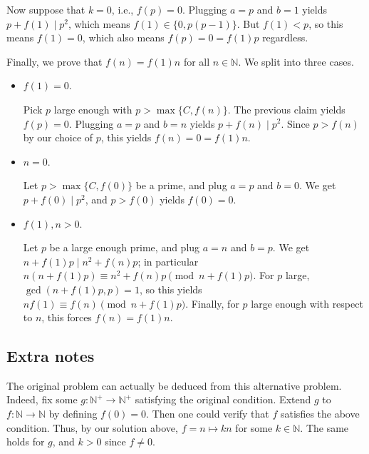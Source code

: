 \documentclass{article}
\newcommand{\N}{\mathbb{N}}
\begin{document}
Now suppose that $k = 0$, i.e., $f(p) = 0$.
Plugging $a = p$ and $b = 1$ yields $p + f(1) \mid p^2$, which means $f(1) \in \{0, p(p - 1)\}$.
But $f(1) < p$, so this means $f(1) = 0$, which also means $f(p) = 0 = f(1) p$ regardless.

Finally, we prove that $f(n) = f(1) n$ for all $n \in \N$.
We split into three cases.

\begin{itemize}

    \item
    $f(1) = 0$.

    Pick $p$ large enough with $p > \max\{C, f(n)\}$.
    The previous claim yields $f(p) = 0$.
    Plugging $a = p$ and $b = n$ yields $p + f(n) \mid p^2$.
    Since $p > f(n)$ by our choice of $p$, this yields $f(n) = 0 = f(1) n$.

    \item 
    $n = 0$.
    
    Let $p > \max\{C, f(0)\}$ be a prime, and plug $a = p$ and $b = 0$.
    We get $p + f(0) \mid p^2$, and $p > f(0)$ yields $f(0) = 0$.

    \item
    $f(1), n > 0$.

    Let $p$ be a large enough prime, and plug $a = n$ and $b = p$.
    We get $n + f(1) p \mid n^2 + f(n) p$; in particular $n (n + f(1) p) \equiv n^2 + f(n) p \pmod{n + f(1) p}$.
    For $p$ large, $\gcd(n + f(1) p, p) = 1$, so this yields $n f(1) \equiv f(n) \pmod{n + f(1) p}$.
    Finally, for $p$ large enough with respect to $n$, this forces $f(n) = f(1) n$.

\end{itemize}



\subsection*{Extra notes}

The original problem can actually be deduced from this alternative problem.
Indeed, fix some $g : \N^+ \to \N^+$ satisfying the original condition.
Extend $g$ to $f : \N \to \N$ by defining $f(0) = 0$.
Then one could verify that $f$ satisfies the above condition.
Thus, by our solution above, $f = n \mapsto kn$ for some $k \in \N$.
The same holds for $g$, and $k > 0$ since $f \neq 0$.
\end{document}
